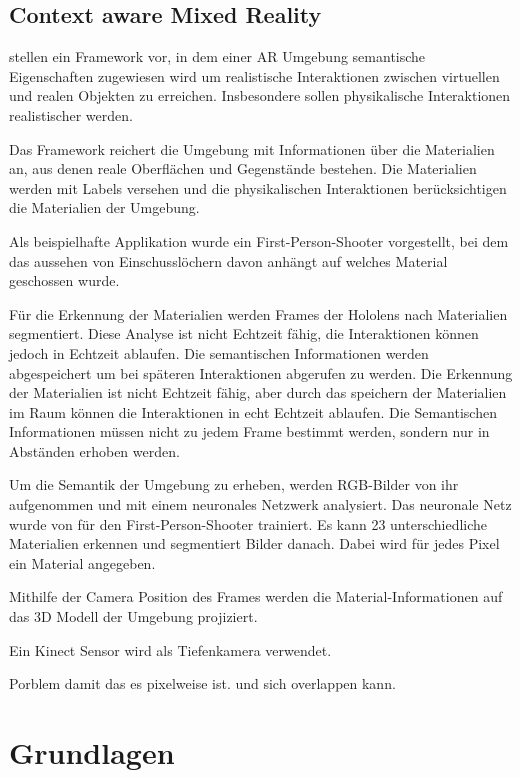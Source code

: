 \subsection{Context aware Mixed Reality}

\cite{contextawaremixedreality} stellen ein Framework vor, in dem einer AR Umgebung semantische Eigenschaften zugewiesen wird um realistische Interaktionen zwischen virtuellen und realen Objekten zu erreichen. 
Insbesondere sollen physikalische Interaktionen realistischer werden.

Das Framework reichert die Umgebung mit Informationen über die Materialien an, aus denen reale Oberflächen und Gegenstände bestehen. Die Materialien werden mit Labels versehen und die physikalischen Interaktionen berücksichtigen die Materialien der Umgebung.

Als beispielhafte Applikation wurde ein First-Person-Shooter vorgestellt, bei dem das aussehen von Einschusslöchern davon anhängt auf welches Material geschossen wurde.

Für die Erkennung der Materialien werden Frames der Hololens nach Materialien segmentiert. Diese Analyse ist nicht Echtzeit fähig, die Interaktionen können jedoch in Echtzeit ablaufen. 
Die semantischen Informationen werden abgespeichert um bei späteren Interaktionen abgerufen zu werden. Die Erkennung der Materialien ist nicht Echtzeit fähig, aber durch das speichern der Materialien im Raum können die Interaktionen in echt Echtzeit ablaufen. Die Semantischen Informationen müssen nicht zu jedem Frame bestimmt werden, sondern nur in Abständen erhoben werden. 

Um die Semantik der Umgebung zu erheben, werden RGB-Bilder von ihr aufgenommen und mit einem neuronales Netzwerk analysiert. Das neuronale Netz wurde von \cite{contextawaremixedreality} für den First-Person-Shooter trainiert. Es kann 23 unterschiedliche Materialien erkennen und segmentiert Bilder danach. Dabei wird für jedes Pixel ein Material angegeben.

Mithilfe der Camera Position des Frames werden die Material-Informationen auf das 3D Modell der Umgebung projiziert. 

Ein Kinect Sensor wird als Tiefenkamera verwendet. 

Porblem damit das es pixelweise ist. und sich overlappen kann. 


\newpage
\section{Grundlagen}
